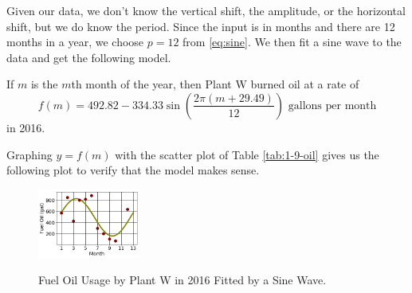 Given our data, we don't know the vertical shift, the amplitude, or the horizontal shift, but we do know the period. Since the input is in months and there are 12 months in a year, we choose $p = 12$ from \ref{eq:sine}. We then fit a sine wave to the data and get the following model.

If $m$ is the $m$th month of the year, then Plant W burned oil at a rate of
$$f(m) = 492.82 - 334.33\sin\left(\frac{2\pi(m+29.49)}{12} \right) \mbox{ gallons per month}$$
in 2016.

Graphing $y=f(m)$ with the scatter plot of Table \ref{tab:1-9-oil} gives us the following plot to verify that the model makes sense.
\begin{figure}[h!]
    \centering
    \includegraphics[width=0.3\textwidth]{img/chap1/sec1-9/fig1-9-oil-curve.png}\\
    \caption{Fuel Oil Usage by Plant W in 2016 Fitted by a Sine Wave.}
    \label{fig:1-9-oil-curve}
\end{figure}
